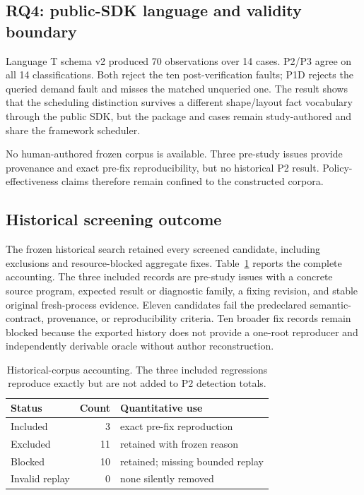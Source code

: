\subsection{RQ4: public-SDK language and validity boundary}
Language T schema v2 produced 70 observations over 14 cases. P2/P3 agree on all 14 classifications. Both reject the ten post-verification faults; P1D rejects the queried demand fault and misses the matched unqueried one. The result shows that the scheduling distinction survives a different shape/layout fact vocabulary through the public SDK, but the package and cases remain study-authored and share the framework scheduler.

No human-authored frozen corpus is available. Three pre-study issues provide provenance and exact pre-fix reproducibility, but no historical P2 result. Policy-effectiveness claims therefore remain confined to the constructed corpora.

\subsection{Historical screening outcome}
The frozen historical search retained every screened candidate, including exclusions and resource-blocked aggregate fixes. Table~\ref{tab:historical-accounting} reports the complete accounting. The three included records are pre-study issues with a concrete source program, expected result or diagnostic family, a fixing revision, and stable original fresh-process evidence. Eleven candidates fail the predeclared semantic-contract, provenance, or reproducibility criteria. Ten broader fix records remain blocked because the exported history does not provide a one-root reproducer and independently derivable oracle without author reconstruction.

\begin{table}[t]
\caption{Historical-corpus accounting. The three included regressions reproduce exactly but are not added to P2 detection totals.}
\label{tab:historical-accounting}
\small
\centering
\begin{tabular}{@{}lrl@{}}
\toprule
Status & Count & Quantitative use \\
\midrule
Included & 3 & exact pre-fix reproduction \\
Excluded & 11 & retained with frozen reason \\
Blocked & 10 & retained; missing bounded replay \\
Invalid replay & 0 & none silently removed \\
\bottomrule
\end{tabular}
\end{table}

